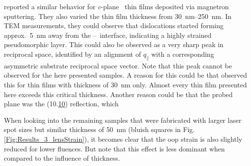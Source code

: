 \textcite{makushko2022} reported a similar behavior for \textit{c}-plane \cro\ thin films deposited via magnetron sputtering.
They also varied the thin film thickness from \qtyrange{30}{250}{\nm}.
In \gls{TEM} measurements, they could observe that dislocations started forming approx.\ \qty{5}{\nm} away from the \cro--\alo\ interface, indicating a highly strained pseudomorphic layer.
This could also be observed as a very sharp peak in reciprocal space, identified by an alignment of $q_\parallel$ with a corresponding asymmetric substrate reciprocal space vector.
Note that this peak cannot be observed for the here presented samples.
A reason for this could be that \citeauthor{makushko2022} observed this for thin films with thickness of \qty{30}{\nm} only.
Almost every thin film presented here exceeds this critical thickness.
Another reason could be that the probed plane was the (10.\underline{10}) reflection, which 

When looking into the remaining samples that were fabricated with larger laser spot sizes but similar thickness of \qty{50}{\nm} (bluish squares in Fig.\,\ref{Fig:Results_3_lensStrain}), it becomes clear that the \gls{oop} strain is also slightly reduced for lower fluences.
But note that this effect is less dominant when compared to the influence of thickness.

